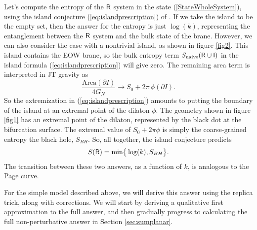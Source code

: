 \documentclass[12pt]{article}
\newcommand{\be}{\begin{equation}}
\newcommand{\ee}{\end{equation}}
\numberwithin{equation}{section}
\begin{document}
Let's compute the entropy of the $\sf{R}$ system in the state (\ref{StateWholeSystem}), using the island conjecture (\ref{eq:islandprescription}) of \cite{Penington:2019npb,Almheiri:2019psf,Almheiri:2019hni}. If we take the island to be the empty set, then the answer for the entropy is just $\log(k)$, representing the entanglement between the $\sf{R}$ system and the bulk state of the brane. However, we can also consider the case with a nontrivial island, as shown in figure \ref{fig2}. This island contains the EOW brane, so the bulk entropy term $S_{\text{naive}}(\sf{R}\cup I)$ in the island formula (\ref{eq:islandprescription}) will give zero. The remaining area term is interpreted in JT gravity as
\be
\frac{\text{Area}(\partial I)}{4G_N} \rightarrow  S_0 + 2\pi\, \phi(\partial I).
\ee
So the extremization in (\ref{eq:islandprescription}) amounts to putting the boundary of the island at an extremal point of the dilaton $\phi$. The geometry shown in figure \ref{fig1} has an extremal point of the dilaton, represented by the black dot at the bifurcation surface. The extremal value of $S_0 + 2\pi \phi$ is simply the coarse-grained entropy the black hole, $S_{BH}$. So, all together, the island conjecture predicts
\be
S({\sf{R}}) = \text{min}\big\{\log(k),S_{BH}\big\}.\label{islandC}
\ee
The transition between these two answers, as a function of $k$, is analogous to the Page curve.

For the simple model described above, we will derive this answer using the replica trick, along with corrections. We will start by deriving a qualitative first approximation to the full answer, and then gradually progress to calculating the full non-perturbative answer in Section \ref{sec:sumplanar}.
\end{document}
